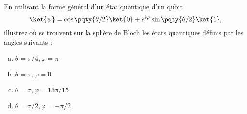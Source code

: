 En utilisant la forme général d'un état quantique d'un qubit
\begin{align*}
  \ket{\psi} = \cos\pqty{\theta/2}\ket{0} + e^{i\varphi}\sin\pqty{\theta/2}\ket{1},
\end{align*}
illustrez où se trouvent sur la sphère de Bloch les états quantiques définis par les angles suivants :
\begin{multicols}{2}
\begin{enumerate}[a)]
  \item $\theta = \pi/4, \varphi = \pi$
  \item $\theta = \pi, \varphi = 0$
  \item $\theta = \pi, \varphi = 13\pi/15$
  \item $\theta = \pi/2, \varphi = -\pi/2$
\end{enumerate}
\end{multicols}

